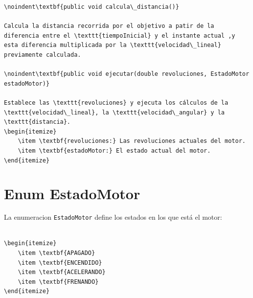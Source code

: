\documentclass{article}
\begin{document}
\begin{lstlisting}
\noindent\textbf{public void calcula\_distancia()}

Calcula la distancia recorrida por el objetivo a patir de la diferencia entre el \texttt{tiempoInicial} y el instante actual ,y esta diferencia multiplicada por la \texttt{velocidad\_lineal} previamente calculada.

\noindent\textbf{public void ejecutar(double revoluciones, EstadoMotor estadoMotor)}

Establece las \texttt{revoluciones} y ejecuta los cálculos de la \texttt{velocidad\_lineal}, la \texttt{velocidad\_angular} y la \texttt{distancia}.
\begin{itemize}
    \item \textbf{revoluciones:} Las revoluciones actuales del motor.
    \item \textbf{estadoMotor:} El estado actual del motor.
\end{itemize}

\end{lstlisting}


\section{Enum EstadoMotor}

La enumeracion \texttt{EstadoMotor} define los estados en los que está el motor:

\begin{lstlisting}

\begin{itemize}
    \item \textbf{APAGADO}
    \item \textbf{ENCENDIDO} 
    \item \textbf{ACELERANDO} 
    \item \textbf{FRENANDO} 
\end{itemize}

\end{lstlisting}
\end{document}
